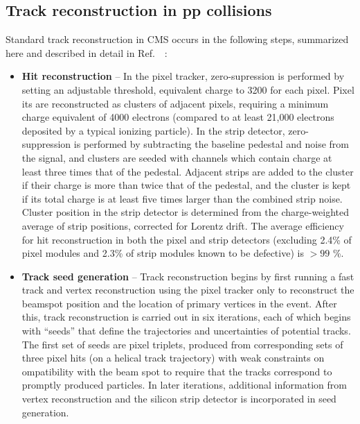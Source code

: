 \subsection{Track reconstruction in pp collisions}

Standard track reconstruction in CMS occurs in the following steps, summarized here and described in detail in Ref.~~\cite{Chatrchyan:2014fea}: 
\begin{itemize}
\item \textbf{Hit reconstruction} --  In the pixel tracker, zero-supression is performed by setting an adjustable threshold, equivalent charge to 3200 for each pixel. Pixel its are reconstructed as clusters of adjacent pixels, requiring a minimum charge equivalent of 4000 electrons (compared to at least 21,000 electrons deposited by a typical ionizing particle).  In the strip detector, zero-suppression is performed by subtracting the baseline pedestal and noise from the signal, and clusters are seeded with channels which contain charge at least three times that of the pedestal.  Adjacent strips are added to the cluster if their charge is more than twice that of the pedestal, and the cluster is kept if its total charge is at least five times larger than the combined strip noise.  Cluster position in the strip detector is determined from the charge-weighted average of strip positions, corrected for Lorentz drift.  The average efficiency for hit reconstruction in both the pixel and strip detectors (excluding 2.4\% of pixel modules and 2.3\% of strip modules known to be defective) is $> 99$ \%.

\item \textbf{Track seed generation}  -- Track reconstruction begins by first running a fast track and vertex reconstruction using the pixel tracker only to reconstruct the beamspot position and the location of primary vertices in the event.  After this, track reconstruction is carried out in six iterations, each of which begins with ``seeds'' that define the trajectories and uncertainties of potential tracks.  The first set of seeds are pixel triplets, produced from corresponding sets of three pixel hits (on a helical track trajectory) with weak constraints on ompatibility with the beam spot to require that the tracks correspond to promptly produced particles.  In later iterations, additional information from vertex reconstruction and the silicon strip detector is incorporated in seed generation.


\end{itemize}
